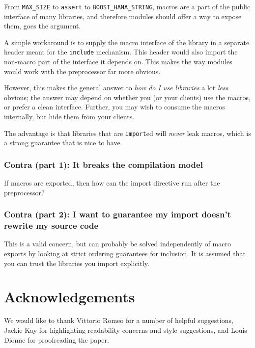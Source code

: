 \documentclass[reqno]{article}
\begin{document}
From \texttt{MAX\_SIZE} to \texttt{assert} to \texttt{BOOST\_HANA\_STRING},
macros are a part of the public interface of many libraries, and therefore
modules should offer a way to expose them, goes the argument.

A simple workaround is to supply the macro interface of the library in a
separate header meant for the \texttt{include} mechanism. This header would
also import the non-macro part of the interface it depends on. This makes the
way modules would work with the preprocessor far more obvious.

However, this makes the general answer to \emph{how do I use libraries} a lot
\emph{less} obvious; the answer may depend on whether you (or your clients) use
the macros, or prefer a clean interface. Further, you may wish to consume the
macros internally, but hide them from your clients. 

The advantage is that libraries that are \texttt{import}ed will \emph{never}
leak macros, which is a strong guarantee that is nice to have.

\subsubsection{Contra (part 1): It breaks the compilation model}

If macros are exported, then how can the import directive run after the
preprocessor?


\subsubsection{Contra (part 2): I want to guarantee my import doesn't rewrite my source code}

This is a valid concern, but can probably be solved independently of macro
exports by looking at strict ordering guarantees for inclusion. It is assumed
that you can trust the libraries you import explicitly.


\section{Acknowledgements}

We would like to thank Vittorio Romeo for a number of helpful suggestions,
Jackie Kay for highlighting readability concerns and style suggestions, and
Louis Dionne for proofreading the paper.


\end{document}
